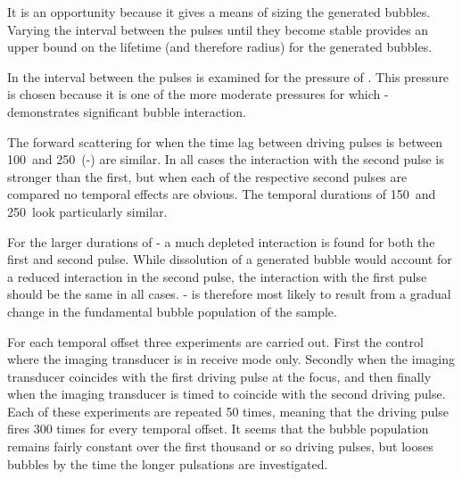It is an opportunity because it gives a  means of sizing the generated bubbles.
Varying the interval between the pulses until they become stable
provides an upper bound on the lifetime (and therefore radius)
for the generated bubbles.

In  the interval between the pulses is examined 
for the pressure of \pOOE.
This pressure is chosen because it is one of the more moderate pressures 
for which - 
demonstrates significant bubble interaction.

The forward scattering for when the time lag between driving pulses 
is between \unit{100}\micro\second\ and \unit{250}\micro\second\ (-) are similar.
In all cases the interaction with the second pulse is stronger than the first,
but when each of the respective second pulses are compared no temporal effects are obvious.
The temporal durations of \unit{150}\micro\second\ and \unit{250}\micro\second\ look particularly similar.


For the larger durations of -
a much depleted interaction is found for both the first and second pulse.
While dissolution of a generated bubble would account for a reduced interaction in the second pulse,
the interaction with the first pulse should be the same in  all cases.
-
is therefore most likely to result from a gradual change in the fundamental bubble population of the sample.

For each temporal offset three experiments are carried out.
First the control where the imaging transducer is in receive mode only.
Secondly when the imaging transducer coincides with the first driving pulse at the focus,
and then finally when the imaging transducer is timed to coincide with the second driving pulse.
Each of these experiments are repeated 50 times, meaning that the driving pulse
fires 300 times for every temporal offset.
It seems that the bubble population remains fairly constant over the first thousand or so driving pulses,
but looses bubbles by the time the longer pulsations are investigated.






